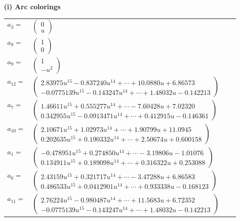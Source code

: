 \documentclass[1p]{elsarticle_modified}
\theoremstyle{definition}
\begin{document}
\flushleft \textbf{(i) Arc colorings}\\
\begin{tabular}{m{7pt} m{180pt} m{7pt} m{180pt} }
\flushright $a_{3}=$&$\begin{pmatrix}0\\u\end{pmatrix}$ \\
\flushright $a_{8}=$&$\begin{pmatrix}1\\0\end{pmatrix}$ \\
\flushright $a_{9}=$&$\begin{pmatrix}1\\- u^2\end{pmatrix}$ \\
\flushright $a_{12}=$&$\begin{pmatrix}2.83975 u^{15}-0.837240 u^{14}+\cdots+10.0880 u+6.86573\\-0.0775139 u^{15}-0.143247 u^{14}+\cdots+1.48032 u-0.142213\end{pmatrix}$ \\
\flushright $a_{7}=$&$\begin{pmatrix}1.46611 u^{15}+0.555277 u^{14}+\cdots-7.60428 u+7.02320\\0.342955 u^{15}-0.0913471 u^{14}+\cdots+0.412915 u-0.146361\end{pmatrix}$ \\
\flushright $a_{10}=$&$\begin{pmatrix}2.10671 u^{15}+1.02973 u^{14}+\cdots+1.90799 u+11.0945\\0.202635 u^{15}+0.190332 u^{14}+\cdots+2.50674 u+0.600158\end{pmatrix}$ \\
\flushright $a_{1}=$&$\begin{pmatrix}-0.478951 u^{15}+0.274850 u^{14}+\cdots-3.19806 u-1.01076\\0.134911 u^{15}+0.189098 u^{14}+\cdots+0.316322 u+0.253088\end{pmatrix}$ \\
\flushright $a_{6}=$&$\begin{pmatrix}2.43159 u^{15}+0.321717 u^{14}+\cdots-3.47288 u+6.86583\\0.486533 u^{15}+0.0412901 u^{14}+\cdots+0.933338 u-0.168123\end{pmatrix}$ \\
\flushright $a_{11}=$&$\begin{pmatrix}2.76224 u^{15}-0.980487 u^{14}+\cdots+11.5683 u+6.72352\\-0.0775139 u^{15}-0.143247 u^{14}+\cdots+1.48032 u-0.142213\end{pmatrix}$ \\

\end{tabular}
\end{document}
